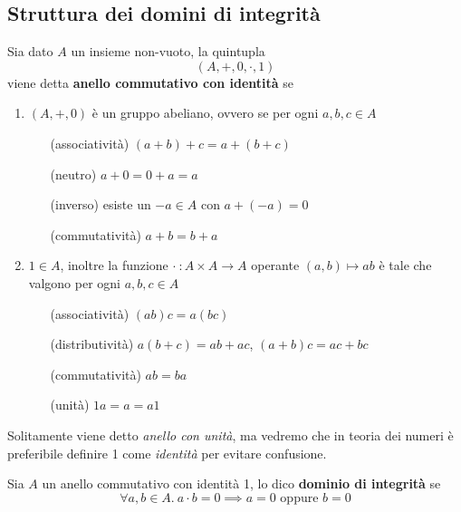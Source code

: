 \subsection{Struttura dei domini di integrità}
\begin{definizione} 
	\label{an_commut}
	Sia dato $A$ un insieme non-vuoto, la quintupla 
	\begin{equation*}
	\left(A,+,0,\cdot,1\right)
	\end{equation*}
	viene detta \textbf{anello commutativo con identità} se 
	\begin{enumerate}
		\item $(A,+,0)$ è un gruppo abeliano, ovvero se per ogni $a,b,c\in A$
		\begin{enumerate}
			\item[(associatività)] $(a+b)+c=a+(b+c)$
			\item[(neutro)] $a+0=0+a=a$
			\item[(inverso)] esiste un $-a\in A$ con $a+(-a)=0$
			\item[(commutatività)] $a+b=b+a$
		\end{enumerate}
		\item $1\in A$, inoltre la funzione $\cdot \ : A\times A \rightarrow A$ operante $(a,b)\mapsto ab$ è tale che valgono per ogni $a,b,c\in A$
		\begin{enumerate}
			\item[(associatività)] $(ab)c=a(bc)$
			\item[(distributività)] $a(b+c)=ab+ac$, $(a+b)c=ac+bc$
			\item[(commutatività)] $ab=ba$
			\item[(unità)] $1a=a=a1$
		\end{enumerate}
	\end{enumerate}
	Solitamente viene detto \textit{anello con unità}, ma vedremo che in teoria dei numeri è preferibile definire 1 come \textit{identità} per evitare confusione.
\end{definizione}
\begin{definizione} 
	Sia $A$ un anello commutativo con identità 1, lo dico \textbf{dominio di integrità} se 
	\begin{equation*}
	\forall a,b \in A. \ a \cdot b = 0 \implies a=0 \text{ oppure } b=0
	\end{equation*}
\end{definizione}
